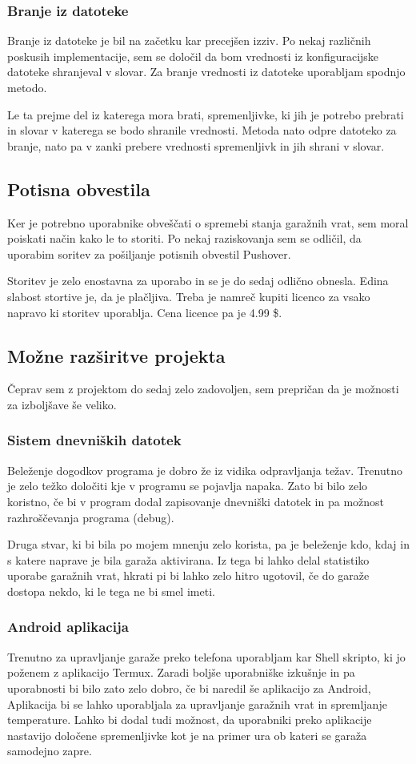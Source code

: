 \documentclass[11pt]{article}
\begin{document}
\subsubsection{Branje iz datoteke}
Branje iz datoteke je bil na začetku kar precejšen izziv. Po nekaj različnih poskusih implementacije, sem se določil da bom vrednosti iz konfiguracijske datoteke shranjeval v slovar. Za branje vrednosti iz datoteke uporabljam spodnjo metodo.

Le ta prejme del iz katerega mora brati, spremenljivke, ki jih je potrebo prebrati in slovar v katerega se bodo shranile vrednosti. Metoda nato odpre datoteko za branje, nato pa v zanki prebere vrednosti spremenljivk in jih shrani v slovar.

\subsection{Potisna obvestila}
Ker je potrebno uporabnike obveščati o spremebi stanja garažnih vrat, sem moral poiskati način kako le to storiti. Po nekaj raziskovanja sem se odličil, da uporabim soritev za pošiljanje potisnih obvestil Pushover\cite{Pushover}.

Storitev je zelo enostavna za uporabo in se je do sedaj odlično obnesla. Edina slabost stortive je, da je plačljiva. Treba je namreč kupiti licenco za vsako napravo ki storitev uporablja. Cena licence pa je 4.99 \$.
\subsection{Možne razširitve projekta}
Čeprav sem z projektom do sedaj zelo zadovoljen, sem prepričan da je možnosti za izboljšave še veliko.
\subsubsection{Sistem dnevniških datotek}
Beleženje dogodkov programa je dobro že iz vidika odpravljanja težav. Trenutno je zelo težko določiti kje v programu se pojavlja napaka. Zato bi bilo zelo koristno, če bi v program dodal zapisovanje dnevniški datotek in pa možnost razhroščevanja programa (debug).

Druga stvar, ki bi bila po mojem mnenju zelo korista, pa je beleženje kdo, kdaj in s katere naprave je bila garaža aktivirana. Iz tega bi lahko delal statistiko uporabe garažnih vrat, hkrati pi bi lahko zelo hitro ugotovil, če do garaže dostopa nekdo, ki le tega ne bi smel imeti.
\subsubsection{Android aplikacija}
Trenutno za upravljanje garaže preko telefona uporabljam kar Shell skripto, ki jo poženem z aplikacijo Termux. Zaradi boljše uporabniške izkušnje in pa uporabnosti bi bilo zato zelo dobro, če bi naredil še aplikacijo za Android, Aplikacija bi se lahko uporabljala za upravljanje garažnih vrat in spremljanje temperature. Lahko bi dodal tudi možnost, da uporabniki preko aplikacije nastavijo določene spremenljivke kot je na primer ura ob kateri se garaža samodejno zapre.
\end{document}
